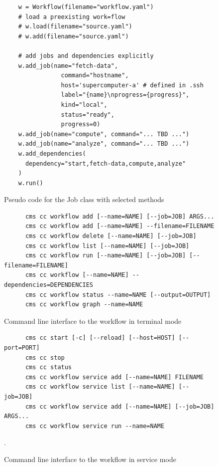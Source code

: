 \begin{figure}[htb]
\begin{verbatim}
    w = Workflow(filename="workflow.yaml")
    # load a preexisting work=flow
    # w.load(filename="source.yaml") 
    # w.add(filename="source.yaml")
    
    # add jobs and dependencies explicitly
    w.add_job(name="fetch-data",
                command="hostname",
                host='supercomputer-a' # defined in .ssh
                label="{name}\nprogress={progress}",
                kind="local",
                status="ready",
                progress=0)
    w.add_job(name="compute", command="... TBD ...")
    w.add_job(name="analyze", command="... TBD ...")
    w.add_dependencies(
      dependency="start,fetch-data,compute,analyze"
    )
    w.run()
\end{verbatim}
\caption{Pseudo code for the Job class with selected methods}
\label{fig:code-workflow-example}

\bigskip

\begin{verbatim}
      cms cc workflow add [--name=NAME] [--job=JOB] ARGS...
      cms cc workflow add [--name=NAME] --filename=FILENAME
      cms cc workflow delete [--name=NAME] [--job=JOB]
      cms cc workflow list [--name=NAME] [--job=JOB]
      cms cc workflow run [--name=NAME] [--job=JOB] [--filename=FILENAME]
      cms cc workflow [--name=NAME] --dependencies=DEPENDENCIES
      cms cc workflow status --name=NAME [--output=OUTPUT]
      cms cc workflow graph --name=NAME
\end{verbatim}
\caption{Command line interface to the workflow in terminal mode}
\label{fig:code-workflow-commandline}

\bigskip

\begin{verbatim}
      cms cc start [-c] [--reload] [--host=HOST] [--port=PORT]
      cms cc stop
      cms cc status
      cms cc workflow service add [--name=NAME] FILENAME
      cms cc workflow service list [--name=NAME] [--job=JOB]
      cms cc workflow service add [--name=NAME] [--job=JOB] ARGS...
      cms cc workflow service run --name=NAME
\end{verbatim}
\caption{Command line interface to the workflow in service mode}
\label{fig:code-workflow-service-commandline}.



\end{figure}
